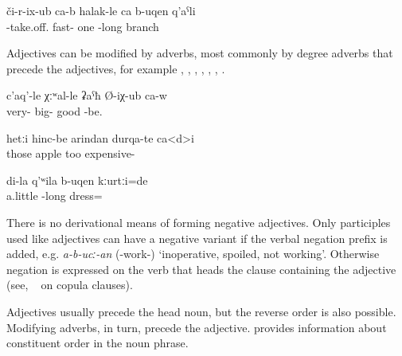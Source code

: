 \begin{exe}
	\ex	\label{ex:He immediately broke one long branch (off a tree)}
	\gll	či-r-ix-ub	ca-b	halak-le	ca	b-uqen	q'aˁli \\
		-take.off.		fast-	one	-long	branch \\
	\glt	{}
\end{exe}

Adjectives can be modified by adverbs, most commonly by degree adverbs that precede the adjectives, for example  ,  ,   ,  ,   ,  ,   . 
%
\begin{exe}
	\ex	\label{ex:He was very very good}
	\gll	c'aq'-le	χːʷal-le	ʡaˁħ	Ø-iχ-ub ca-w \\
		very-	big-	good	-be.  \\
	\glt	{}

	\ex	\label{ex:The apples are too expensive}
	\gll	hetːi	hinc-be	arindan	durqa-te	ca<d>i \\
		those	apple	too	expensive- 	\\
	\glt	{}

	\ex	\label{ex:My shirt was a bit long}
	\gll	di-la	q'ʷila	b-uqen	kːurtːi=de \\
			a.little	-long	dress= \\
	\glt	{}
\end{exe}

There is no derivational means of forming negative adjectives. Only participles used like adjectives can have a negative variant if the verbal negation prefix  is added, e.g. \textit{a-b-ucː-an} (-work-) `inoperative, spoiled, not working'. Otherwise negation is expressed on the verb that heads the clause containing the adjective (see, \teg\  on copula clauses).

Adjectives usually precede the head noun, but the reverse order is also possible. Modifying adverbs, in turn, precede the adjective.  provides information about constituent order in the noun phrase.


